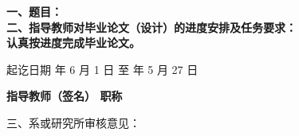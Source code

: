 \cleardoublepage{}

{
    \bfseries
    \noindent 一、题目：\Title \\
    \noindent 二、指导教师对毕业论文（设计）的进度安排及任务要求：\\

    认真按进度完成毕业论文。

    \vskip 50mm

    \noindent 起讫日期  年 6 月 1 日 \quad 至  年 5 月 27 日
    \begin{flushright}
        \bfseries {}
            指导教师（签名） \underline{} 职称 \underline{}
    \end{flushright}

    \noindent 三、系或研究所审核意见：\\

    \mbox{} \vfill
    \signature{负责人（签名）}
}

